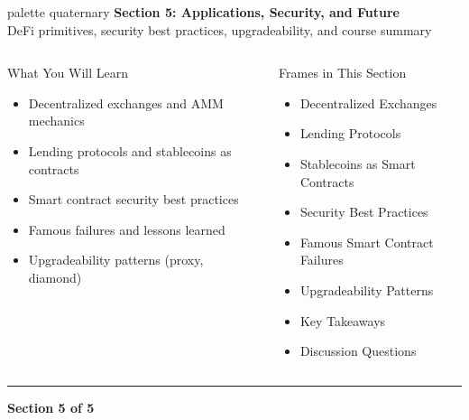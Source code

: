 \documentclass[8pt,aspectratio=169]{beamer}
\newcommand{\bottomnote}[1]{\vfill\vspace{-2mm}\textcolor{mllavender2}{\rule{\textwidth}{0.4pt}}\vspace{1mm}\footnotesize\textbf{#1}}
\begin{document}
\begin{frame}{}
\begin{beamercolorbox}[sep=12pt,center,rounded=true,shadow=true]{palette quaternary}
  {\Large\bfseries Section 5: Applications, Security, and Future}\\[6pt]
  {\normalsize DeFi primitives, security best practices, upgradeability, and course summary}
\end{beamercolorbox}
\vspace{4mm}
\begin{columns}[T]
\begin{block}{What You Will Learn}
\footnotesize
\begin{itemize}
  \item Decentralized exchanges and AMM mechanics
  \item Lending protocols and stablecoins as contracts
  \item Smart contract security best practices
  \item Famous failures and lessons learned
  \item Upgradeability patterns (proxy, diamond)
\end{itemize}
\end{block}
\begin{block}{Frames in This Section}
\footnotesize
\begin{itemize}
  \item Decentralized Exchanges
  \item Lending Protocols
  \item Stablecoins as Smart Contracts
  \item Security Best Practices
  \item Famous Smart Contract Failures
  \item Upgradeability Patterns
  \item Key Takeaways
  \item Discussion Questions
\end{itemize}
\end{block}
\end{columns}
\bottomnote{Section 5 of 5}
\end{frame}
\end{document}
